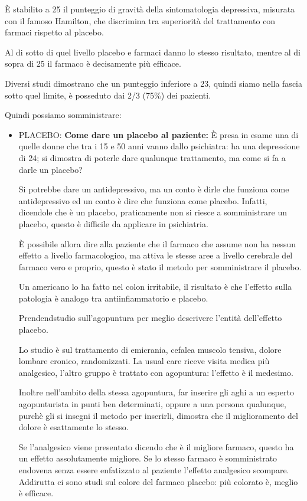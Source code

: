 \begin{itemize}
\begin{itemize}
È stabilito a 25 il punteggio di gravità della sintomatologia
depressiva, misurata con il famoso Hamilton, che discrimina tra
superiorità del trattamento con farmaci rispetto al placebo.

Al di sotto di quel livello placebo e farmaci danno lo stesso risultato,
mentre al di sopra di 25 il farmaco è decisamente più efficace.

Diversi studi dimostrano che un punteggio inferiore a 23, quindi siamo
nella fascia sotto quel limite, è posseduto dai 2/3 (75\%) dei pazienti.

Quindi possiamo somministrare:

\begin{itemize}
\item
  PLACEBO: \textbf{Come dare un placebo al paziente:} È presa in esame
  una di quelle donne che tra i 15 e 50 anni vanno dallo psichiatra: ha
  una depressione di 24; si dimostra di poterle dare qualunque
  trattamento, ma come si fa a darle un placebo?

  Si potrebbe dare un antidepressivo, ma un conto è dirle che funziona
  come antidepressivo ed un conto è dire che funziona come placebo.
  Infatti, dicendole che è un placebo, praticamente non si riesce a
  somministrare un placebo, questo è difficile da applicare in
  psichiatria.

  È possibile allora dire alla paziente che il farmaco che assume non ha
  nessun effetto a livello farmacologico, ma attiva le stesse aree a
  livello cerebrale del farmaco vero e proprio, questo è stato il metodo
  per somministrare il placebo.

  Un americano lo ha fatto nel colon irritabile, il risultato è che
  l'effetto sulla patologia è analogo tra antiinfiammatorio e placebo.

  Prendendstudio sull'agopuntura per meglio descrivere l'entità
  dell'effetto placebo.

  Lo studio è sul trattamento di emicrania, cefalea muscolo tensiva,
  dolore lombare cronico, randomizzati. La usual care riceve visita
  medica più analgesico, l'altro gruppo è trattato con agopuntura:
  l'effetto è il medesimo.

  Inoltre nell'ambito della stessa agopuntura, far inserire gli aghi a
  un esperto agopunturista in punti ben determinati, oppure a una
  persona qualunque, purchè gli si insegni il metodo per inserirli,
  dimostra che il miglioramento del dolore è esattamente lo stesso.

  Se l'analgesico viene presentato dicendo che è il migliore farmaco,
  questo ha un effetto assolutamente migliore. Se lo stesso farmaco è
  somministrato endovena senza essere enfatizzato al paziente l'effetto
  analgesico scompare. Addirutta ci sono studi sul colore del farmaco
  placebo: più colorato è, meglio è efficace.


\end{itemize}
\end{itemize}
\end{itemize}
